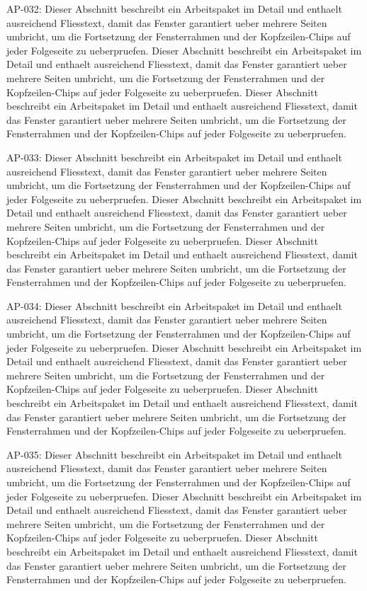 \documentclass[type=report,theme=dark,language=de]{semio}
\begin{document}
\begin{Table}[title=Lange Tabelle]
AP-032: Dieser Abschnitt beschreibt ein Arbeitspaket im Detail und enthaelt ausreichend Fliesstext, damit das Fenster garantiert ueber mehrere Seiten umbricht, um die Fortsetzung der Fensterrahmen und der Kopfzeilen-Chips auf jeder Folgeseite zu ueberpruefen. Dieser Abschnitt beschreibt ein Arbeitspaket im Detail und enthaelt ausreichend Fliesstext, damit das Fenster garantiert ueber mehrere Seiten umbricht, um die Fortsetzung der Fensterrahmen und der Kopfzeilen-Chips auf jeder Folgeseite zu ueberpruefen. Dieser Abschnitt beschreibt ein Arbeitspaket im Detail und enthaelt ausreichend Fliesstext, damit das Fenster garantiert ueber mehrere Seiten umbricht, um die Fortsetzung der Fensterrahmen und der Kopfzeilen-Chips auf jeder Folgeseite zu ueberpruefen. 

AP-033: Dieser Abschnitt beschreibt ein Arbeitspaket im Detail und enthaelt ausreichend Fliesstext, damit das Fenster garantiert ueber mehrere Seiten umbricht, um die Fortsetzung der Fensterrahmen und der Kopfzeilen-Chips auf jeder Folgeseite zu ueberpruefen. Dieser Abschnitt beschreibt ein Arbeitspaket im Detail und enthaelt ausreichend Fliesstext, damit das Fenster garantiert ueber mehrere Seiten umbricht, um die Fortsetzung der Fensterrahmen und der Kopfzeilen-Chips auf jeder Folgeseite zu ueberpruefen. Dieser Abschnitt beschreibt ein Arbeitspaket im Detail und enthaelt ausreichend Fliesstext, damit das Fenster garantiert ueber mehrere Seiten umbricht, um die Fortsetzung der Fensterrahmen und der Kopfzeilen-Chips auf jeder Folgeseite zu ueberpruefen. 

AP-034: Dieser Abschnitt beschreibt ein Arbeitspaket im Detail und enthaelt ausreichend Fliesstext, damit das Fenster garantiert ueber mehrere Seiten umbricht, um die Fortsetzung der Fensterrahmen und der Kopfzeilen-Chips auf jeder Folgeseite zu ueberpruefen. Dieser Abschnitt beschreibt ein Arbeitspaket im Detail und enthaelt ausreichend Fliesstext, damit das Fenster garantiert ueber mehrere Seiten umbricht, um die Fortsetzung der Fensterrahmen und der Kopfzeilen-Chips auf jeder Folgeseite zu ueberpruefen. Dieser Abschnitt beschreibt ein Arbeitspaket im Detail und enthaelt ausreichend Fliesstext, damit das Fenster garantiert ueber mehrere Seiten umbricht, um die Fortsetzung der Fensterrahmen und der Kopfzeilen-Chips auf jeder Folgeseite zu ueberpruefen. 

AP-035: Dieser Abschnitt beschreibt ein Arbeitspaket im Detail und enthaelt ausreichend Fliesstext, damit das Fenster garantiert ueber mehrere Seiten umbricht, um die Fortsetzung der Fensterrahmen und der Kopfzeilen-Chips auf jeder Folgeseite zu ueberpruefen. Dieser Abschnitt beschreibt ein Arbeitspaket im Detail und enthaelt ausreichend Fliesstext, damit das Fenster garantiert ueber mehrere Seiten umbricht, um die Fortsetzung der Fensterrahmen und der Kopfzeilen-Chips auf jeder Folgeseite zu ueberpruefen. Dieser Abschnitt beschreibt ein Arbeitspaket im Detail und enthaelt ausreichend Fliesstext, damit das Fenster garantiert ueber mehrere Seiten umbricht, um die Fortsetzung der Fensterrahmen und der Kopfzeilen-Chips auf jeder Folgeseite zu ueberpruefen. 


\end{Table}
\end{document}
